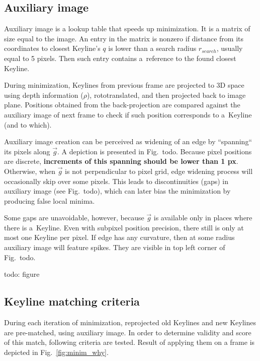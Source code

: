 \subsection{Auxiliary image}
\label{sec:aux}

Auxiliary image is a lookup table that speeds up minimization. It is a matrix of size equal to the image. An entry in the matrix is nonzero if distance from its coordinates to closest Keyline's $q$ is lower than a search radius $r_{search}$, usually equal to 5 pixels. Then such entry contains a~reference to the found closest Keyline.

During minimization, Keylines from previous frame are projected to 3D space using depth information ($\rho$), rototranslated, and then projected back to image plane. Positions obtained from the back-projection are compared against the auxiliary image of next frame to check if such position corresponds to a~Keyline (and to which).

Auxiliary image creation can be perceived as widening of an edge by ``spanning`` its pixels along $\vec{g}$. A depiction is presented in Fig.~todo. Because pixel positions are discrete, \textbf{increments of this spanning should be lower than 1 px}. Otherwise, when $\vec{g}$ is not perpendicular to pixel grid, edge widening process will occasionally skip over some pixels. This leads to discontinuities (gaps) in auxiliary image (see Fig.~todo), which can later bias the minimization by producing false local minima.

Some gaps are unavoidable, however, because $\vec{g}$ is available only in places where there is a~Keyline. Even with subpixel position precision, there still is only at most one Keyline per pixel. If edge has any curvature, then at some radius auxiliary image will feature spikes. They are visible in top left corner of Fig.~todo.

todo: figure



\subsection{Keyline matching criteria}
\label{sec:minim_match}

During each iteration of minimization, reprojected old Keylines and new Keylines are pre-matched, using auxiliary image. In order to determine validity and score of this match, following criteria are tested. Result of applying them on a frame is depicted in Fig.~\ref{fig:minim_why}.

